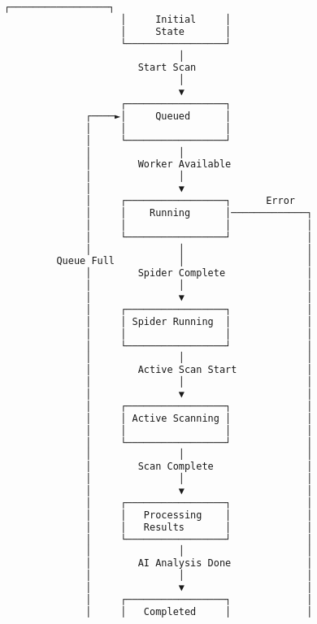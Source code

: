 \documentclass[main.tex]{subfiles}
\begin{document}
\begin{figure}[h]
\centering
\begin{lstlisting}[language=bash, caption=Scan State диаграм]
                    ┌─────────────────┐
                    │     Initial     │
                    │     State       │
                    └─────────────────┘
                              │
                       Start Scan
                              │
                              ▼
                    ┌─────────────────┐
              ┌────►│     Queued      │
              │     │                 │
              │     └─────────────────┘
              │               │
              │        Worker Available
              │               │
              │               ▼
              │     ┌─────────────────┐      Error
              │     │    Running      │─────────────┐
              │     │                 │             │
              │     └─────────────────┘             │
              │               │                     │
         Queue Full           │                     │
              │        Spider Complete              │
              │               │                     │
              │               ▼                     │
              │     ┌─────────────────┐             │
              │     │ Spider Running  │             │
              │     │                 │             │
              │     └─────────────────┘             │
              │               │                     │
              │        Active Scan Start            │
              │               │                     │
              │               ▼                     │
              │     ┌─────────────────┐             │
              │     │ Active Scanning │             │
              │     │                 │             │
              │     └─────────────────┘             │
              │               │                     │
              │        Scan Complete                │
              │               │                     │
              │               ▼                     │
              │     ┌─────────────────┐             │
              │     │   Processing    │             │
              │     │   Results       │             │
              │     └─────────────────┘             │
              │               │                     │
              │        AI Analysis Done             │
              │               │                     │
              │               ▼                     │
              │     ┌─────────────────┐             │
              │     │   Completed     │             │

\end{lstlisting}
\end{figure}
\end{document}
